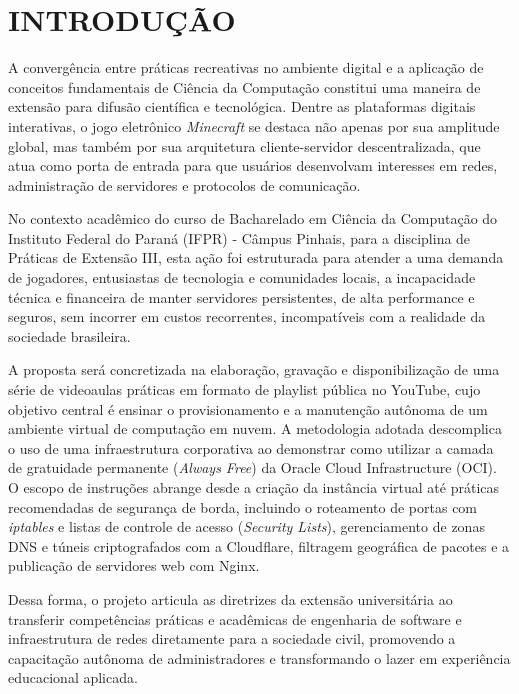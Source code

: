 
\chapter{INTRODUÇÃO}
\label{capitulo-introducao}
    A convergência entre práticas recreativas no ambiente digital e a aplicação de conceitos fundamentais de Ciência da Computação constitui uma maneira de extensão para difusão científica e tecnológica. Dentre as plataformas digitais interativas, o jogo eletrônico \textit{Minecraft} se destaca não apenas por sua amplitude global, mas também por sua arquitetura cliente-servidor descentralizada, que atua como porta de entrada para que usuários desenvolvam interesses em redes, administração de servidores e protocolos de comunicação.

    No contexto acadêmico do curso de Bacharelado em Ciência da Computação do Instituto Federal do Paraná (IFPR) - Câmpus Pinhais, para a disciplina de Práticas de Extensão III, esta ação foi estruturada para atender a uma demanda de jogadores, entusiastas de tecnologia e comunidades locais, a incapacidade técnica e financeira de manter servidores persistentes, de alta performance e seguros, sem incorrer em custos recorrentes, incompatíveis com a realidade da sociedade brasileira.

    A proposta será concretizada na elaboração, gravação e disponibilização de uma série de videoaulas práticas em formato de playlist pública no YouTube, cujo objetivo central é ensinar o provisionamento e a manutenção autônoma de um ambiente virtual de computação em nuvem. A metodologia adotada descomplica o uso de uma infraestrutura corporativa ao demonstrar como utilizar a camada de gratuidade permanente (\textit{Always Free}) da Oracle Cloud Infrastructure (OCI). O escopo de instruções abrange desde a criação da instância virtual até práticas recomendadas de segurança de borda, incluindo o roteamento de portas com \textit{iptables} e listas de controle de acesso (\textit{Security Lists}), gerenciamento de zonas DNS e túneis criptografados com a Cloudflare, filtragem geográfica de pacotes e a publicação de servidores web com Nginx.

    Dessa forma, o projeto articula as diretrizes da extensão universitária ao transferir competências práticas e acadêmicas de engenharia de software e infraestrutura de redes diretamente para a sociedade civil, promovendo a capacitação autônoma de administradores e transformando o lazer em experiência educacional aplicada.